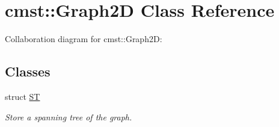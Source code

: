 \hypertarget{classcmst_1_1_graph2_d}{}\section{cmst::Graph2D Class Reference}
\label{classcmst_1_1_graph2_d}


Collaboration diagram for cmst::Graph2D:
\subsection*{Classes}
\begin{DoxyCompactItemize}
\item 
struct \hyperlink{structcmst_1_1_graph2_d_1_1_s_t}{ST}
\begin{DoxyCompactList}\small\item\em Store a spanning tree of the graph. \end{DoxyCompactList}\end{DoxyCompactItemize}
